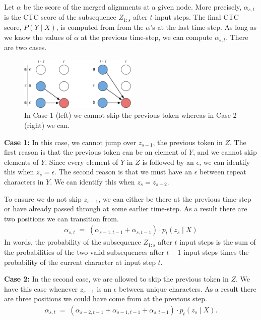 Let $\alpha$ be the score of the merged alignments at a given node. More
precisely, $\alpha_{s, t}$ is the CTC score of the subsequence $Z_{1:s}$ after
$t$ input steps.  The final CTC score, $P(Y \mid X)$, is computed from from the
$\alpha$'s at the last time-step. As long as we know the values of $\alpha$ at
the previous time-step, we can compute $\alpha_{s, t}$. There are two cases.

\begin{figure}[ht!]
\centering
\includegraphics[width=0.5\textwidth]{background/figures/cases.pdf}
\caption{In Case 1 (left) we cannot skip the previous token whereas in Case 2
    (right) we can.}
\end{figure}

{\bf Case 1:} In this case, we cannot jump over $z_{s-1}$, the previous token
in $Z$. The first reason is that the previous token can be an element of $Y$,
and we cannot skip elements of $Y$. Since every element of $Y$ in $Z$ is
followed by an $\epsilon$, we can identify this when $z_{s} = \epsilon$. The
second reason is that we must have an $\epsilon$ between repeat characters in
$Y$. We can identify this when $z_s = z_{s-2}$.

To ensure we do not skip $z_{s-1}$, we can either be there at the previous
time-step or have already passed through at some earlier time-step. As a result
there are two positions we can transition from.
\begin{align*}
\alpha_{s, t} \; = \; (\alpha_{s-1, t-1} + \alpha_{s, t-1}) \cdot p_t(z_{s} \mid X)
\end{align*}
In words, the probability of the subsequence $Z_{1:s}$ after $t$ input steps is
the sum of the probabilities of the two valid subsequences after $t-1$ input
steps times the probability of the current character at input step $t$.

{\bf Case 2:} In the second case, we are allowed to skip the previous token in
$Z$. We have this case whenever $z_{s-1}$ is an $\epsilon$ between unique
characters. As a result there are three positions we could have come from at
the previous step.
\begin{align*}
\alpha_{s, t} \; = \; (\alpha_{s-2, t-1} + \alpha_{s-1, t-1} + \alpha_{s, t-1}) \cdot
    p_t(z_{s} \mid X).
\end{align*}

